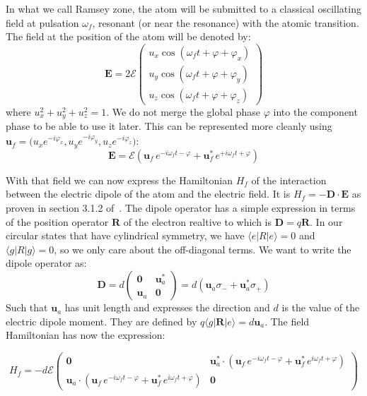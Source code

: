 \documentclass[10pt]{report}
\theoremstyle{plain}
\theoremstyle{definition}
\theoremstyle{remark}
\newcommand{\ket}[1]{|#1\rangle}
\newcommand{\bra}[1]{\langle#1|}
\newcommand{\mat}[1]{\begin{pmatrix}#1\end{pmatrix}}
\newcommand{\bs}{\boldsymbol}
\begin{document}

In what we call Ramsey zone, the atom will be submitted to a classical oscillating
field at pulsation $\omega_f$, resonant (or near the resonance) with the atomic
transition. The field at the position of the atom will
be denoted by:
\[\bs E = 2\mathcal{E}
  \mat{u_x\cos(\omega_f t + \varphi + \varphi_x)\\
    u_y\cos(\omega_f t + \varphi + \varphi_y)\\
    u_z\cos(\omega_f t + \varphi + \varphi_z)}\]
where $u_x^2 + u_y^2 +u_z^2 = 1$. We do not merge the global phase $\varphi$ into
the component phase to be able to use it later. This can be represented more
cleanly using $\bs u_f = \big(u_x e^{-i\varphi_x},u_y e^{-i\varphi_y},u_z
e^{-i\varphi_z}\big)$:
\begin{equation}\label{eqn:field}
\bs E = \mathcal{E} (\bs u_f\, e^{-i\omega_f t-\varphi} + \bs u_f^*\,
  e^{+i\omega_f t + \varphi})
\end{equation}


With that field we can now express the Hamiltonian $H_f$ of the
interaction between the electric dipole of the
atom and the electric field. It is $H_f = - \bs D \cdot \bs E$ as proven in
section 3.1.2 of~\cite{Har06}.
The dipole operator has a simple expression in terms
of the position operator $\bs R$ of the electron realtive to  which is $\bs D = q \bs R$.
In our circular states that have cylindrical symmetry,
we have $\bra e R \ket e = 0$ and $\bra g R \ket g = 0$,
so we only care about the off-diagonal terms. We want to write the dipole
operator as:
\begin{equation}\label{eqn:D}
  \bs D = d\mat{\bs 0&\bs u_a^*\\\bs u_a&\bs 0} = d(\bs u_a \sigma_- + \bs u_a^* \sigma_+)
\end{equation}
Such that $\bs u_a$ has unit length and expresses the direction
and $d$ is the value of the electric dipole
moment. They are defined by $ q \bra g \bs R \ket e = d \bs u_a$. The field
Hamiltonian has now the expression:

\[ H_f = -d\mathcal{E} \mat{\bs 0 &
  \bs u_a^* \cdot (\bs u_f\, e^{-i\omega_f t-\varphi} + \bs u_f^*\,
  e^{i\omega_f t + \varphi})\\
\bs u_a \cdot (\bs u_f\, e^{-i\omega_f t-\varphi} + \bs u_f^*\,
  e^{i\omega_f t + \varphi}) & \bs 0
}\]

\
\end{document}
